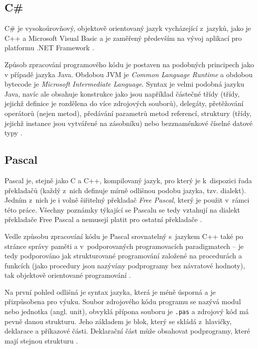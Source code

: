 \documentclass[onepage, a4paper, 12pt]{bakalarka}
\begin{document}
\subsection{C\#}
C\# je vysokoúrovňový, objektově orientovaný jazyk vycházející z~jazyků, jako je C++ a Microsoft Visual Basic a je zaměřený především na vývoj aplikací pro platformu .NET Framework \cite{cs-book, cs-guide-basic}.\par
Způsob zpracování programového kódu je postaven na podobných principech jako v případě jazyka Java. Obdobou JVM je \textit{Common Language Runtime} a obdobou bytecode je \textit{Microsoft Intermediate Language}. Syntax je velmi podobná jazyku Java, navíc ale obsahuje konstrukce jako jsou například částečné třídy (třídy, jejichž definice je rozdělena do více zdrojových souborů), delegáty, přetěžování operátorů (nejen metod), předávání parametrů metod referencí, struktury (třídy, jejichž instance jsou vytvářené na zásobníku) nebo bezznaménkové číselné datové typy \cite{cs-book, cs-guide-clr, cs-guide-msil, cs-guide-jit, cs-guide-types}.\par

\subsection{Pascal}
Pascal je, stejně jako C a C++, kompilovaný jazyk, pro který je k~dispozici řada překladačů (každý z~nich definuje mírně odlišnou podobu jazyka, tzv. dialekt). Jedním z~nich je i volně šiřitelný překladač \textit{Free Pascal}, který je použit v~rámci této práce. Všechny poznámky týkající se Pascalu se tedy vztahují na dialekt překladače Free Pascal a nemusejí platit pro ostatní překladače \cite{pas-book}.\par
Vedle způsobu zpracování kódu je Pascal srovnatelný s~jazykem C++ také po stránce správy paměti a v~podporovaných programovacích paradigmatech -- je tedy podporováno jak strukturované programování založené na procedurách a funkcích (jako procedury jsou nazývány podprogramy bez návratové hodnoty), tak objektově orientované programování \cite{pas-book}.\par
Na první pohled odlišná je syntax jazyka, která je méně úsporná a je přizpůsobena pro výuku. Soubor zdrojového kódu programu se nazývá modul nebo jednotka (angl. unit), obvyklá přípona souboru je \texttt{.pas} a zdrojový kód má pevně danou strukturu. Jeho základem je blok, který se skládá z~hlavičky, deklarace a příkazové části. Deklarační část může obsahovat podprogramy, které mají stejnou strukturu \cite{pas-book, pas-guide-about}.\par
\end{document}
